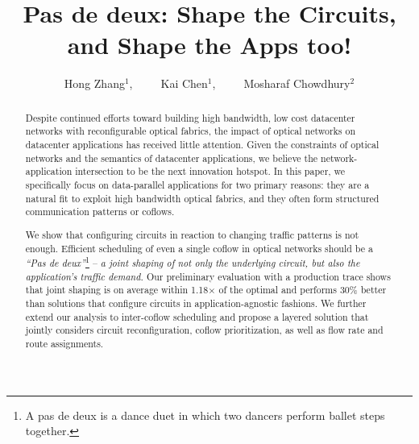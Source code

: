 \documentclass[sigconf,10pt]{acmart}
\begin{document}
\title{Pas de deux:  Shape the Circuits, \\ and Shape the Apps too!}
\vspace{-0.1in}
\author{Hong Zhang$^{1}$,~~~~~Kai Chen$^1$,~~~~~Mosharaf Chowdhury$^2$}
\renewcommand{\authors}{Hong Zhang, Kai Chen, Mosharaf Chowdhury}




\renewcommand{\shortauthors}{H. Zhang et al.}
\renewcommand{\shorttitle}{Pas de deux:  Shape the Circuits, and Shape the Apps too!}
\begin{abstract}
Despite continued efforts toward building high bandwidth, low cost datacenter networks with reconfigurable optical fabrics, the impact of optical networks on datacenter applications has received little attention.
Given the constraints of optical networks and the semantics of datacenter applications, we believe the network-application intersection to be the next innovation hotspot.
In this paper, we specifically focus on data-parallel applications for two primary reasons: they are a natural fit to exploit high bandwidth optical fabrics, and they often form structured communication patterns or coflows.

We show that configuring circuits in reaction to changing traffic patterns is not enough.
Efficient scheduling of even a single coflow in optical networks should be a \emph{``Pas de deux''}\footnote{A pas de deux is a dance duet in which two dancers perform ballet steps together.} -- \emph{ a joint shaping of not only the underlying circuit, but also the application's traffic demand.}
Our preliminary evaluation with a production trace shows that joint shaping is on average within 1.18$\times$ of the optimal and performs $30\%$ better than solutions that configure circuits in application-agnostic fashions.
We further extend our analysis to inter-coflow scheduling and propose a layered solution that jointly considers circuit reconfiguration, coflow prioritization, as well as flow rate and route assignments.
\end{abstract}
\end{document}
